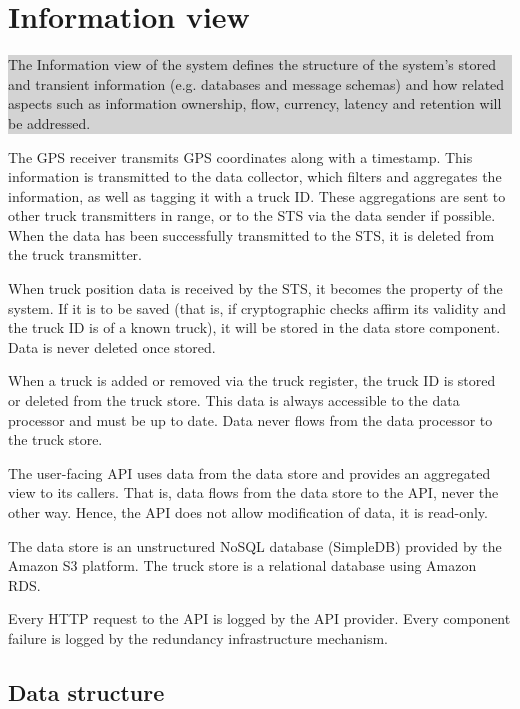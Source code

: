 \documentclass[a4paper,11pt]{report}
\newcommand{\instructions}[1]{
  \noindent\colorbox{lightgray}{%
    \parbox{\linewidth}{%
      #1
    }%
  }%
 \vspace{0.1cm}
}
\begin{document}
\section{Information view}
\label{cha:information-view}

\instructions{
The Information view of the system defines the structure of the
system’s stored and transient information (e.g. databases and message
schemas) and how related aspects such as information ownership, flow,
currency, latency and retention will be addressed.
}

The GPS receiver transmits GPS coordinates along with a timestamp.
This information is transmitted to the data collector, which filters
and aggregates the information, as well as tagging it with a truck ID.
These aggregations are sent to other truck transmitters in range, or
to the STS via the data sender if possible.  When the data has been
successfully transmitted to the STS, it is deleted from the truck
transmitter.

When truck position data is received by the STS, it becomes the
property of the system.  If it is to be saved (that is, if
cryptographic checks affirm its validity and the truck ID is of a
known truck), it will be stored in the data store component.  Data is
never deleted once stored.

When a truck is added or removed via the truck register, the truck ID
is stored or deleted from the truck store.  This data is always
accessible to the data processor and must be up to date.  Data never
flows from the data processor to the truck store.

The user-facing API uses data from the data store and provides an
aggregated view to its callers.  That is, data flows from the data
store to the API, never the other way.  Hence, the API does not allow
modification of data, it is read-only.

The data store is an unstructured NoSQL database (SimpleDB) provided
by the Amazon S3 platform.  The truck store is a relational database
using Amazon RDS.

Every HTTP request to the API is logged by the API provider.  Every
component failure is logged by the redundancy infrastructure
mechanism.

\subsection{Data structure}
\label{sec:data-structure}
\end{document}
